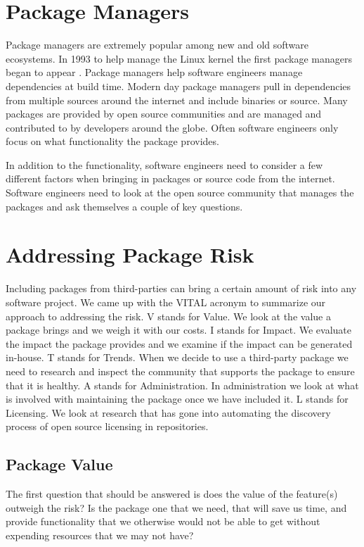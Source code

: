 \documentclass[journal]{IEEEtran}
\begin{document}
\section{Package Managers}
Package managers are extremely popular among new and old software ecosystems. In 1993 to help manage the Linux kernel the first package managers began to appear \cite{Katz}. Package managers help software engineers manage dependencies at build time. Modern day package managers pull in dependencies from multiple sources around the internet and include binaries or source. Many packages are provided by open source communities and are managed and contributed to by developers around the globe. Often software engineers only focus on what functionality the package provides.

In addition to the functionality, software engineers need to consider a few different factors when bringing in packages or source code from the internet. Software engineers need to look at the open source community that manages the packages and ask themselves a couple of key questions. 

\section{Addressing Package Risk}
Including packages from third-parties can bring a certain amount of risk into any software project. We came up with the VITAL acronym to summarize our approach to addressing the risk. V stands for Value. We look at the value a package brings and we weigh it with our costs. I stands for Impact. We evaluate the impact the package provides and we examine if the impact can be generated in-house. T stands for Trends. When we decide to use a third-party package we need to research and inspect the community that supports the package to ensure that it is healthy. A stands for Administration. In administration we look at what is involved with maintaining the package once we have included it. L stands for Licensing. We look at research that has gone into automating the discovery process of open source licensing in repositories.  

\subsection{Package Value}
The first question that should be answered is does the value of the feature(s) outweigh the risk? Is the package one that we need, that will save us time, and provide functionality that we otherwise would not be able to get without expending resources that we may not have? 
\end{document}

